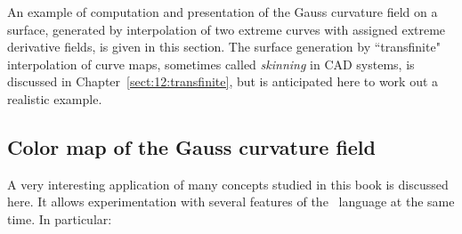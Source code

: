 \documentclass{31x47jw}
\begin{document}
An example of computation and presentation of the Gauss curvature
field on a surface, generated by interpolation of two extreme curves
with assigned extreme derivative fields, is given in this section. 
The surface generation by ``transfinite" interpolation of curve maps,
sometimes called \emph{skinning} in CAD systems, is discussed in
Chapter~\ref{sect:12:transfinite}, but is anticipated here to work out
a realistic example.

\subsection{Color map of the Gauss  curvature field}
\label{subsec:5:gaussmap}


A very interesting application of many concepts studied in this book
is discussed here.  It allows experimentation with several features of
the \pl\ language at the same time.  In particular:
\end{document}
